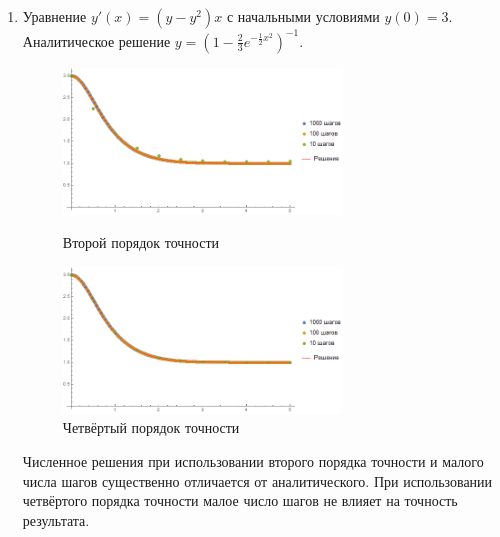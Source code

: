 \documentclass[a4paper,12pt,titlepage,finall]{article}
\begin{document}
\begin{enumerate}
\newpage
\item
Уравнение $y'(x) = (y - y^2) x$ с начальными условиями $y(0)= 3$. Аналитическое решение $y = \left( 1- \frac{2}{3} e^{-\frac{1}{2}x^2} \right)^{-1}$.
\begin{figure}[h]
\centering
\includegraphics[width=0.7\textwidth]{test_1_4_2.png}
\caption{Второй порядок точности}
\centering
\includegraphics[width=0.7\textwidth]{test_1_4_4.png}
\caption{Четвёртый порядок точности}
\end{figure}
\par
Численное решения при использовании второго порядка точности и малого числа шагов существенно отличается от аналитического. При использовании четвёртого порядка точности малое число шагов не влияет на точность результата.


\end{enumerate}
\end{document}
